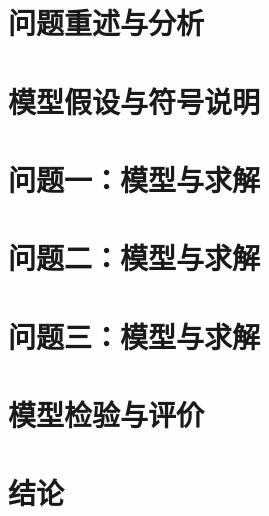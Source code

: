 \section{问题重述与分析}

\section{模型假设与符号说明}

\section{问题一：模型与求解}

\section{问题二：模型与求解}

\section{问题三：模型与求解}

\section{模型检验与评价}

\section{结论}
